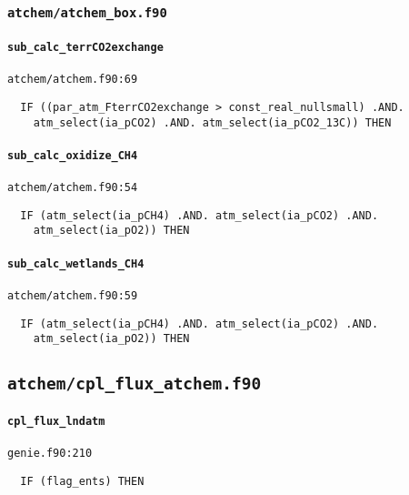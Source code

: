 \documentclass[a4paper,10pt,article]{memoir}
\begin{document}
\subsubsection*{\texttt{atchem/atchem\_box.f90}}

\paragraph{\texttt{sub\_calc\_terrCO2exchange}}

\texttt{atchem/atchem.f90:69}

\begin{verbatim}
  IF ((par_atm_FterrCO2exchange > const_real_nullsmall) .AND.
    atm_select(ia_pCO2) .AND. atm_select(ia_pCO2_13C)) THEN
\end{verbatim}

\paragraph{\texttt{sub\_calc\_oxidize\_CH4}}

\texttt{atchem/atchem.f90:54}

\begin{verbatim}
  IF (atm_select(ia_pCH4) .AND. atm_select(ia_pCO2) .AND.
    atm_select(ia_pO2)) THEN
\end{verbatim}

\paragraph{\texttt{sub\_calc\_wetlands\_CH4}}

\texttt{atchem/atchem.f90:59}

\begin{verbatim}
  IF (atm_select(ia_pCH4) .AND. atm_select(ia_pCO2) .AND.
    atm_select(ia_pO2)) THEN
\end{verbatim}

\subsection*{\texttt{atchem/cpl\_flux\_atchem.f90}}

\paragraph{\texttt{cpl\_flux\_lndatm}}

\texttt{genie.f90:210}

\begin{verbatim}
  IF (flag_ents) THEN
\end{verbatim}
\end{document}
